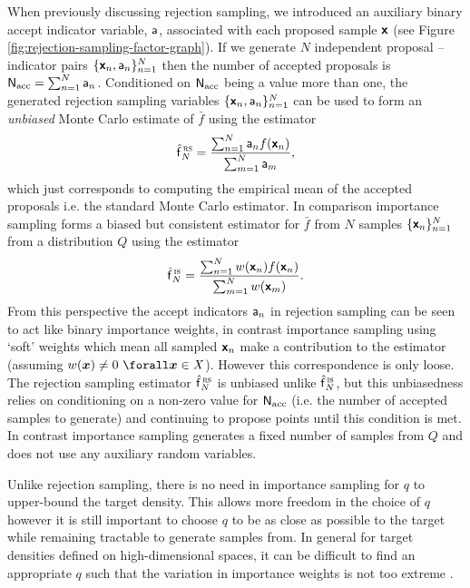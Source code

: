 When previously discussing rejection sampling, we introduced an auxiliary binary accept indicator variable, $\mathsf{a}$, associated with each proposed sample $\boldsymbol{\mathsf{x}}$ (see Figure \ref{fig:rejection-sampling-factor-graph}). If we generate $N$ independent proposal -- indicator pairs $\lbrace \boldsymbol{\mathsf{x}}_n, \mathsf{a}_n \rbrace_{n=1}^N$ then the number of accepted proposals is $\mathsf{N}_{\textrm{acc}} = \sum_{n=1}^N \mathsf{a}_n$. Conditioned on $\mathsf{N}_{\textrm{acc}}$ being a value more than one, the generated rejection sampling variables $\lbrace \boldsymbol{\mathsf{x}}_n, \mathsf{a}_n \rbrace_{n=1}^N$ can be used to form an \emph{unbiased} Monte Carlo estimate of $\bar{f}$ using the estimator
\begin{equation}\label{eq:rejection-sampler-mc-estimator}
  \hatf_N^{\,\textsc{rs}} = \frac{\sum_{n=1}^N\rvar{a}_n f\lpa\rvct{x}_n\rpa}{\sum_{m=1}^N \rvar{a}_m},
\end{equation}
which just corresponds to computing the empirical mean of the accepted proposals i.e. the standard Monte Carlo estimator. In comparison importance sampling forms a biased but consistent estimator for $\bar{f}$ from $N$ samples $\lbrace \boldsymbol{\mathsf{x}}_n \rbrace_{n=1}^N$ from a distribution $Q$ using the estimator
\begin{equation}\label{eq:importance-sampler-mc-estimator}
  \hatf_N^{\,\textsc{is}} = \frac{\sum_{n=1}^N w\lpa\rvct{x}_n\rpa f\lpa\rvct{x}_n\rpa}{\sum_{m=1}^N w\lpa\rvct{x}_m\rpa}.
\end{equation}
From this perspective the accept indicators $\mathsf{a}_n$ in rejection sampling can be seen to act like binary importance weights, in contrast importance sampling using `soft' weights which mean all sampled $\boldsymbol{\mathsf{x}}_n$ make a contribution to the estimator (assuming $w(\vct{x}) \neq 0 ~\forall \vct{x} \in \set{X}$). However this correspondence is only loose. The rejection sampling estimator $\hatf_N^{\,\textsc{rs}}$ is unbiased unlike $\hatf_N^{\,\textsc{is}}$, but this unbiasedness relies on conditioning on a non-zero value for $\mathsf{N}_{\textrm{acc}}$ (i.e. the number of accepted samples to generate) and continuing to propose points until this condition is met. In contrast importance sampling generates a fixed number of samples from $Q$ and does not use any auxiliary random variables.

Unlike rejection sampling, there is no need in importance sampling for $q$ to upper-bound the target density. This allows more freedom in the choice of $q$ however it is still important to choose $q$ to be as close as possible to the target while remaining tractable to generate samples from. In general for target densities defined on high-dimensional spaces, it can be difficult to find an appropriate $q$ such that the variation in importance weights is not too extreme \citep{mackay2003information}. %

